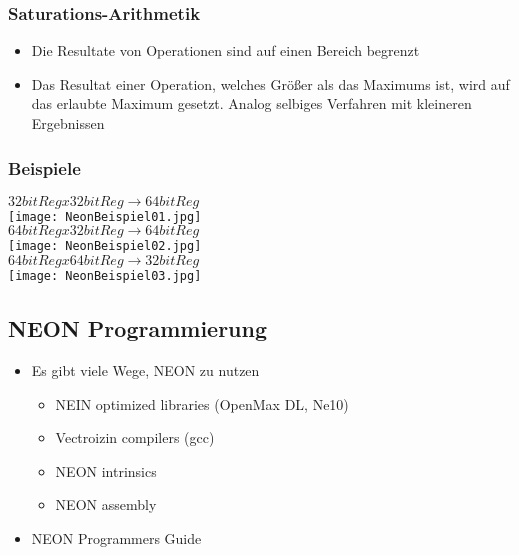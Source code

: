 		\subsubsection{Saturations-Arithmetik}
			\begin{itemize}
				\item Die Resultate von Operationen sind auf einen Bereich begrenzt
				\item Das Resultat einer Operation, welches Größer als das Maximums ist,
					wird auf das erlaubte Maximum gesetzt. Analog selbiges Verfahren mit 
					kleineren Ergebnissen
			\end{itemize}


		\subsubsection{Beispiele}
			\begin{center}
				$32bit Reg x 32bit Reg \rightarrow 64bit Reg$ \\
				\texttt{[image: NeonBeispiel01.jpg]} \\
				$64bit Reg x 32bit Reg \rightarrow 64bit Reg$ \\
				\texttt{[image: NeonBeispiel02.jpg]} \\
				$64bit Reg x 64bit Reg \rightarrow 32bit Reg$ \\
				\texttt{[image: NeonBeispiel03.jpg]} \\
			\end{center}



	\subsection{NEON Programmierung}
		\begin{itemize}
			\item Es gibt viele Wege, NEON zu nutzen
				\begin{itemize}
					\item NEIN optimized libraries (OpenMax DL, Ne10)
					\item Vectroizin compilers (gcc)
					\item NEON intrinsics
					\item NEON assembly
				\end{itemize}
			\item NEON Programmers Guide
		\end{itemize}



